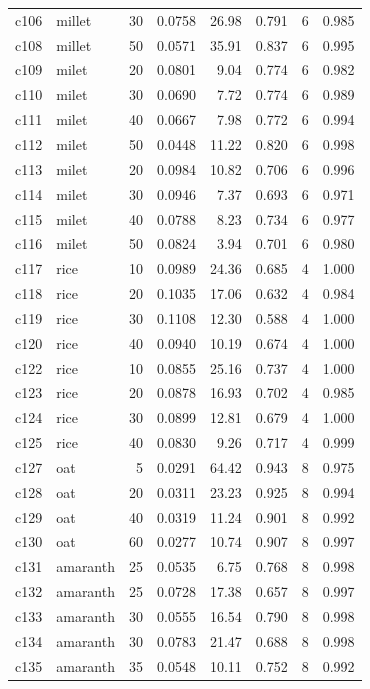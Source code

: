 \begin{longtable}{llrrrrrr}
c106 & millet & 30 & 0.0758 & 26.98 & 0.791 & 6 & 0.985 \\
c108 & millet & 50 & 0.0571 & 35.91 & 0.837 & 6 & 0.995 \\
c109 & milet & 20 & 0.0801 & 9.04 & 0.774 & 6 & 0.982 \\
c110 & milet & 30 & 0.0690 & 7.72 & 0.774 & 6 & 0.989 \\
c111 & milet & 40 & 0.0667 & 7.98 & 0.772 & 6 & 0.994 \\
c112 & milet & 50 & 0.0448 & 11.22 & 0.820 & 6 & 0.998 \\
c113 & milet & 20 & 0.0984 & 10.82 & 0.706 & 6 & 0.996 \\
c114 & milet & 30 & 0.0946 & 7.37 & 0.693 & 6 & 0.971 \\
c115 & milet & 40 & 0.0788 & 8.23 & 0.734 & 6 & 0.977 \\
c116 & milet & 50 & 0.0824 & 3.94 & 0.701 & 6 & 0.980 \\
c117 & rice & 10 & 0.0989 & 24.36 & 0.685 & 4 & 1.000 \\
c118 & rice & 20 & 0.1035 & 17.06 & 0.632 & 4 & 0.984 \\
c119 & rice & 30 & 0.1108 & 12.30 & 0.588 & 4 & 1.000 \\
c120 & rice & 40 & 0.0940 & 10.19 & 0.674 & 4 & 1.000 \\
c122 & rice & 10 & 0.0855 & 25.16 & 0.737 & 4 & 1.000 \\
c123 & rice & 20 & 0.0878 & 16.93 & 0.702 & 4 & 0.985 \\
c124 & rice & 30 & 0.0899 & 12.81 & 0.679 & 4 & 1.000 \\
c125 & rice & 40 & 0.0830 & 9.26 & 0.717 & 4 & 0.999 \\
c127 & oat & 5 & 0.0291 & 64.42 & 0.943 & 8 & 0.975 \\
c128 & oat & 20 & 0.0311 & 23.23 & 0.925 & 8 & 0.994 \\
c129 & oat & 40 & 0.0319 & 11.24 & 0.901 & 8 & 0.992 \\
c130 & oat & 60 & 0.0277 & 10.74 & 0.907 & 8 & 0.997 \\
c131 & amaranth & 25 & 0.0535 & 6.75 & 0.768 & 8 & 0.998 \\
c132 & amaranth & 25 & 0.0728 & 17.38 & 0.657 & 8 & 0.997 \\
c133 & amaranth & 30 & 0.0555 & 16.54 & 0.790 & 8 & 0.998 \\
c134 & amaranth & 30 & 0.0783 & 21.47 & 0.688 & 8 & 0.998 \\
c135 & amaranth & 35 & 0.0548 & 10.11 & 0.752 & 8 & 0.992 \\

\end{longtable}
